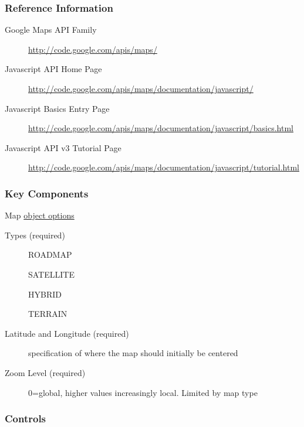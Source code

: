 \documentclass[]{article}
\begin{document}
\subsubsection{Reference Information}\label{reference-information}

\begin{description}
\item[Google Maps API Family]
\url{http://code.google.com/apis/maps/}
\item[Javascript API Home Page]
\url{http://code.google.com/apis/maps/documentation/javascript/}
\item[Javascript Basics Entry Page]
\url{http://code.google.com/apis/maps/documentation/javascript/basics.html}
\item[Javascript API v3 Tutorial Page]
\url{http://code.google.com/apis/maps/documentation/javascript/tutorial.html}
\end{description}

\subsubsection{Key Components}\label{key-components}

Map \href{http://tinyurl.com/mlsj3ar}{object options}

\begin{description}
\item[Types (required)]
ROADMAP

SATELLITE

HYBRID

TERRAIN
\item[Latitude and Longitude (required)]
specification of where the map should initially be centered
\item[Zoom Level (required)]
0=global, higher values increasingly local. Limited by map type
\end{description}

\subsubsection{Controls}\label{controls}
\end{document}
